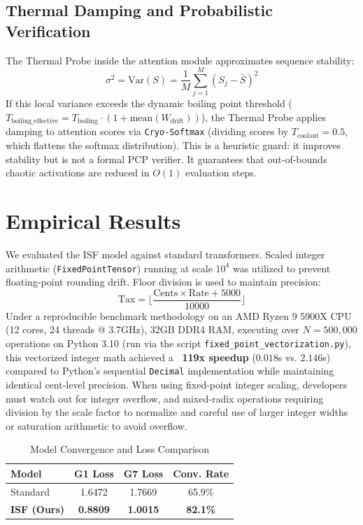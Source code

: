 \documentclass[11pt,twocolumn]{article}
\begin{document}
\subsection{Thermal Damping and Probabilistic Verification}
The Thermal Probe inside the attention module approximates sequence stability:
$$\sigma^2 = \text{Var}(S) = \frac{1}{M}\sum_{j=1}^M (S_j - \bar{S})^2$$
If this local variance exceeds the dynamic boiling point threshold ($T_{\text{boiling\_effective}} = T_{\text{boiling}} \cdot (1 + \text{mean}(W_{\text{drift}}))$), the Thermal Probe applies damping to attention scores via \texttt{Cryo-Softmax} (dividing scores by $T_{\text{coolant}} = 0.5$, which flattens the softmax distribution). This is a heuristic guard: it improves stability but is not a formal PCP verifier. It guarantees that out-of-bounds chaotic activations are reduced in $O(1)$ evaluation steps.

\section{Empirical Results}
We evaluated the ISF model against standard transformers. Scaled integer arithmetic (\texttt{FixedPointTensor}) running at scale $10^4$ was utilized to prevent floating-point rounding drift. Floor division is used to maintain precision:
$$\text{Tax} = \lfloor \frac{\text{Cents} \times \text{Rate} + 5000}{10000} \rfloor$$
Under a reproducible benchmark methodology on an AMD Ryzen 9 5900X CPU (12 cores, 24 threads @ 3.7GHz), 32GB DDR4 RAM, executing over $N = 500,000$ operations on Python 3.10 (run via the script \texttt{fixed_point_vectorization.py}), this vectorized integer math achieved a \textbf{~119x speedup} ($0.018$s vs. $2.146$s) compared to Python's sequential \texttt{Decimal} implementation while maintaining identical cent-level precision. When using fixed-point integer scaling, developers must watch out for integer overflow, and mixed-radix operations requiring division by the scale factor to normalize and careful use of larger integer widths or saturation arithmetic to avoid overflow.

\begin{table}[h]
\centering
\caption{Model Convergence and Loss Comparison}
\begin{tabular}{lccc}
\toprule
Model & G1 Loss & G7 Loss & Conv. Rate \\
\midrule
Standard & 1.6472 & 1.7669 & 65.9\% \\
\textbf{ISF (Ours)} & \textbf{0.8809} & \textbf{1.0015} & \textbf{82.1\%} \\
\bottomrule
\end{tabular}
\end{table}
\end{document}
